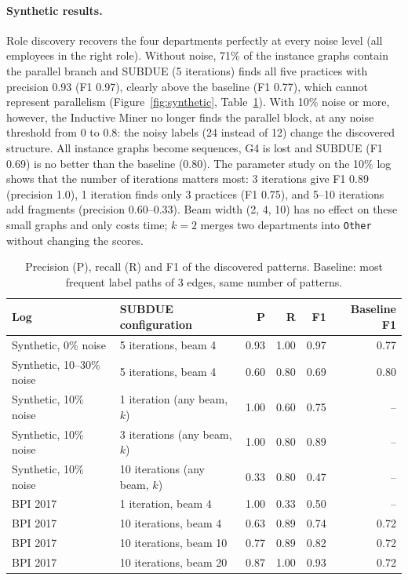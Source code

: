 \documentclass{article}
\begin{document}
\paragraph{Synthetic results.} Role discovery recovers the four departments
perfectly at every noise level (all employees in the right role). Without
noise, 71\% of the instance graphs contain the parallel branch and SUBDUE (5
iterations) finds all five practices with precision 0.93 (F1 0.97), clearly
above the baseline (F1 0.77), which cannot represent parallelism
(Figure~\ref{fig:synthetic}, Table~\ref{tab:results}). With 10\% noise or more, however, the Inductive
Miner no longer finds the parallel block, at any noise threshold from 0 to 0.8:
the noisy labels (24 instead of 12) change the discovered structure. All
instance graphs become sequences, G4 is lost and SUBDUE (F1 0.69) is no better
than the baseline (0.80). The parameter study on the 10\% log shows that the
number of iterations matters most: 3 iterations give F1 0.89 (precision 1.0),
1 iteration finds only 3 practices (F1 0.75), and 5--10 iterations add
fragments (precision 0.60--0.33). Beam width (2, 4, 10) has no effect on these
small graphs and only costs time; $k=2$ merges two departments into
\texttt{Other} without changing the scores.


\begin{table}[t]
\centering\small
\caption{Precision (P), recall (R) and F1 of the discovered patterns. Baseline: most
frequent label paths of 3 edges, same number of patterns.}
\label{tab:results}
\begin{tabular}{llrrrr}
\toprule
Log & SUBDUE configuration & P & R & F1 & Baseline F1 \\
\midrule
Synthetic, 0\% noise & 5 iterations, beam 4 & 0.93 & 1.00 & 0.97 & 0.77 \\
Synthetic, 10--30\% noise & 5 iterations, beam 4 & 0.60 & 0.80 & 0.69 & 0.80 \\
Synthetic, 10\% noise & 1 iteration (any beam, $k$) & 1.00 & 0.60 & 0.75 & -- \\
Synthetic, 10\% noise & 3 iterations (any beam, $k$) & 1.00 & 0.80 & 0.89 & -- \\
Synthetic, 10\% noise & 10 iterations (any beam, $k$) & 0.33 & 0.80 & 0.47 & -- \\
\midrule
BPI 2017 & 1 iteration, beam 4 & 1.00 & 0.33 & 0.50 & -- \\
BPI 2017 & 10 iterations, beam 4 & 0.63 & 0.89 & 0.74 & 0.72 \\
BPI 2017 & 10 iterations, beam 10 & 0.77 & 0.89 & 0.82 & 0.72 \\
BPI 2017 & 10 iterations, beam 20 & 0.87 & 1.00 & 0.93 & 0.72 \\
\bottomrule
\end{tabular}
\end{table}
\end{document}
